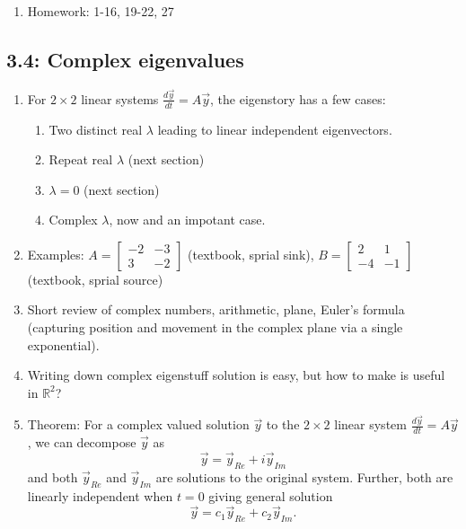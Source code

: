 \documentclass{article}
\begin{document}
\begin{enumerate}
\item Homework: 1-16, 19-22, 27

\end{enumerate}


\subsection{3.4: Complex eigenvalues}
\begin{enumerate}

\item For $2 \times 2$ linear systems $\frac{d\vec{y}}{dt} = A \vec{y}$, the eigenstory has a few cases:
\begin{enumerate}
\item Two distinct real $\lambda$ leading to linear independent eigenvectors.
\item Repeat real $\lambda$ (next section)
\item $\lambda = 0$ (next section)
\item Complex $\lambda$, now and an impotant case.
\end{enumerate}

\item Examples: $A = \begin{bmatrix}
-2 & -3 \\ 3 & -2
\end{bmatrix}$ (textbook, sprial sink), 
$B = \begin{bmatrix}
2 & 1 \\ -4 & -1
\end{bmatrix}$ (textbook, sprial source)

\item Short review of complex numbers, arithmetic, plane, Euler's formula (capturing position and movement in the complex plane via a single exponential).

\item Writing down complex eigenstuff solution is easy, but how to make is useful in $\mathbb{R}^2$?

\item Theorem: For a complex valued solution $\vec{y}$ to the $2 \times 2$ linear system $\frac{d\vec{y}}{dt} = A\vec{y}$, we can decompose $\vec{y}$ as 
\[
\vec{y} = \vec{y}_{Re} + i \vec{y}_{Im}
\]
and both $\vec{y}_{Re}$ and $\vec{y}_{Im}$ are solutions to the original system. Further, both are linearly independent when $t=0$ giving general solution
\[
\vec{y} = c_1\vec{y}_{Re} + c_2 \vec{y}_{Im}.
\]


\end{enumerate}
\end{document}
